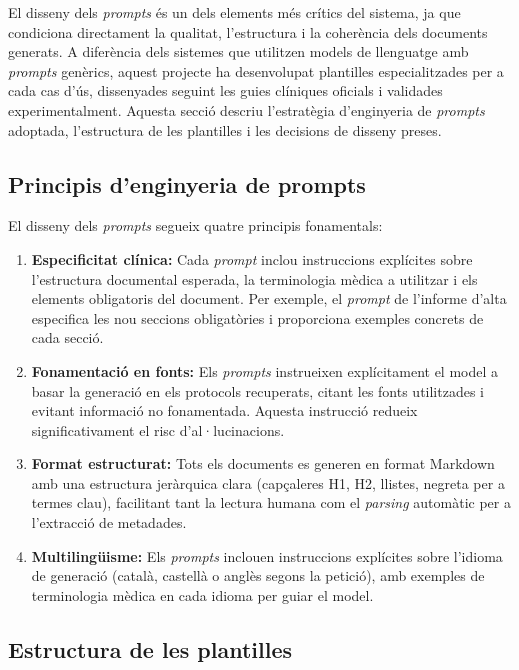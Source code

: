 \documentclass[CAT]{TFUOC}%
\begin{document}
El disseny dels \textit{prompts} és un dels elements més crítics del sistema, ja que condiciona directament la qualitat, l'estructura i la coherència dels documents generats. A diferència dels sistemes que utilitzen models de llenguatge amb \textit{prompts} genèrics, aquest projecte ha desenvolupat plantilles especialitzades per a cada cas d'ús, dissenyades seguint les guies clíniques oficials i validades experimentalment. Aquesta secció descriu l'estratègia d'enginyeria de \textit{prompts} adoptada, l'estructura de les plantilles i les decisions de disseny preses.

\subsection{Principis d'enginyeria de prompts}

El disseny dels \textit{prompts} segueix quatre principis fonamentals:

\begin{enumerate}
    \item \textbf{Especificitat clínica:} Cada \textit{prompt} inclou instruccions explícites sobre l'estructura documental esperada, la terminologia mèdica a utilitzar i els elements obligatoris del document. Per exemple, el \textit{prompt} de l'informe d'alta especifica les nou seccions obligatòries i proporciona exemples concrets de cada secció.

    \item \textbf{Fonamentació en fonts:} Els \textit{prompts} instrueixen explícitament el model a basar la generació en els protocols recuperats, citant les fonts utilitzades i evitant informació no fonamentada. Aquesta instrucció redueix significativament el risc d'al·lucinacions.

    \item \textbf{Format estructurat:} Tots els documents es generen en format Markdown amb una estructura jeràrquica clara (capçaleres H1, H2, llistes, negreta per a termes clau), facilitant tant la lectura humana com el \textit{parsing} automàtic per a l'extracció de metadades.

    \item \textbf{Multilingüisme:} Els \textit{prompts} inclouen instruccions explícites sobre l'idioma de generació (català, castellà o anglès segons la petició), amb exemples de terminologia mèdica en cada idioma per guiar el model.
\end{enumerate}

\subsection{Estructura de les plantilles}
\end{document}
